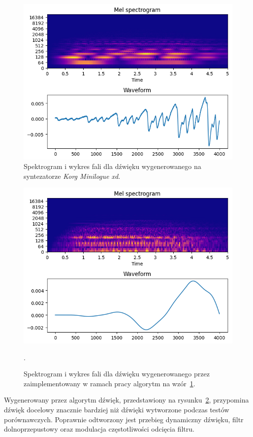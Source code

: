 \begin{figure}[H]
    \centering
    \includegraphics[width=0.7\linewidth]{rys06/target_minilogue.png}
    \caption{
      Spektrogram i wykres fali dla dźwięku wygenerowanego 
      na syntezatorze \textit{Korg Minilogue xd}.
    }\label{fig:minilogue_target_sample}
\end{figure}

\begin{figure}[H]
    \centering
    \includegraphics[width=0.7\linewidth]{rys06/evolved_minilogue.png}
    \caption{
      Spektrogram i wykres fali dla dźwięku wygenerowanego 
      przez zaimplementowany w ramach pracy algorytm na
      wzór~\ref{fig:minilogue_target_sample}.
    }\label{fig:evolved_minilogue_sample}.
\end{figure}

Wygenerowany przez algorytm dźwięk, przedstawiony na
rysunku~\ref{fig:evolved_minilogue_sample}, przypomina
dźwięk docelowy znacznie bardziej niż dźwięki wytworzone
podczas testów porównawczych. Poprawnie odtworzony
jest przebieg dynamiczny dźwięku, filtr dolnoprzepustowy
oraz modulacja częstotliwości odcięcia filtru.

